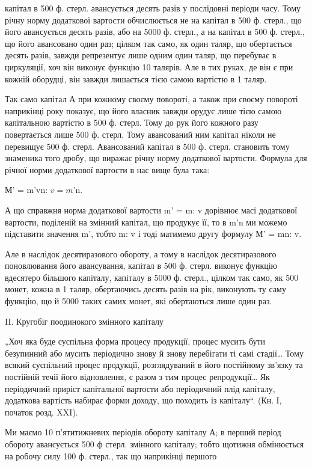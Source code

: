 \parcont{}  %
капітал в 500 ф. стерл. авансується десять разів у послідовні періоди часу.
Тому річну норму додаткової вартости обчислюється не на капітал в 500 ф.
стерл., що його авансується десять разів, або на 5000 ф. стерл., а на капітал
в 500 ф. стерл., що його авансовано один раз; цілком так само,
як один таляр, що обертається десять разів, завжди репрезентує лише
одним один таляр, що перебуває в циркуляції, хоч він виконує функцію
10 талярів. Але в тих руках, де він є при кожній оборудці, він завжди
лишається тією самою вартістю в 1 таляр.

Так само капітал А при кожному своєму повороті, а також при своєму
повороті наприкінці року показує, що його власник завжди орудує
лише тією самою капітальною вартістю в 500 ф. стерл. Тому до рук його
кожного разу повертається лише 500 ф. стерл. Тому авансований ним капітал
ніколи не перевищує 500 ф. стерл. Авансований капітал в 500 ф. стерл.
становить тому знаменика того дробу, що виражає річну норму додаткової
вартости. Формула для річної норми додаткової вартости в нас
вище була така:

М' = m'vn: $v = m$'n.

А що справжня норма додаткової вартости m' = m: v дорівнює масі додаткової
вартости, поділеній на змінний капітал, що продукує її, то в
m'n ми можемо підставити значення m', тобто m: v і тоді матимемо другу
формулу М' = mn: v.

Але в наслідок десятиразового обороту, а тому в наслідок десятиразового
поновлювання його авансування, капітал в 500 ф. стерл. виконує
функцію вдесятеро більшого капіталу, капіталу в 5000 ф. стерл., цілком так
само, як 500 монет, кожна в 1 таляр, обертаючись десять разів на рік,
виконують ту саму функцію, що й 5000 таких самих монет, які обертаються
лише один раз.

II. Кругобіг поодинокого змінного капіталу

„Хоч яка буде суспільна форма процесу продукції, процес мусить
бути безупинний або мусить періодично знову й знову перебігати ті самі
стадії\dots{} Тому всякий суспільний процес продукції, розглядуваний в
його постійному зв’язку та постійній течії його відновлення, є разом з
тим процес репродукції\dots{} Як періодичний приріст капітальної вартости
або періодичний плід капіталу, додаткова вартість набирає форми доходу,
що походить із капіталу“. (Кн. І, початок розд. XXI).

Ми маємо 10 п’ятитижневих періодів обороту капіталу А; в перший
період обороту авансується 500 ф стерл. змінного капіталу; тобто щотижня
обмінюється на робочу силу 100 ф. стерл., так що наприкінці першого
\parbreak{}  %
